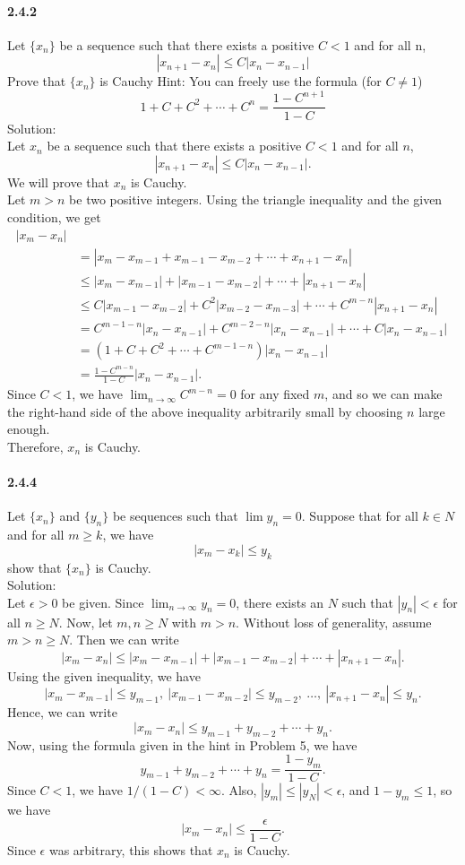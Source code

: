 \documentclass{article}
\begin{document}
\paragraph{2.4.2}
Let $\{x_n\}$ be a sequence such that there exists a positive $C < 1$ and for all n, $$|x_{n+1}-x_n|\leq C|x_n-x_{n-1}|$$
Prove that $\{x_n\}$ is Cauchy Hint: You can freely use the formula (for $C\neq 1$)\\
$$1+C+C^2+\cdots +C^n=\frac{1-C^{n+1}}{1-C}$$
Solution:\\
Let ${x_n}$ be a sequence such that there exists a positive $C < 1$ and for all $n$, $$|x_{n+1}-x_n|\leq C|x_n-x_{n-1}|.$$ We will prove that ${x_n}$ is Cauchy.\\
Let $m>n$ be two positive integers. Using the triangle inequality and the given condition, we get
\begin{align*}
|x_m - x_n| \\&= |x_m - x_{m-1} + x_{m-1} - x_{m-2} + \cdots + x_{n+1} - x_n|\ \\
&\leq |x_m - x_{m-1}| + |x_{m-1} - x_{m-2}| + \cdots + |x_{n+1} - x_n|\
\\&\leq C|x_{m-1} - x_{m-2}| + C^2|x_{m-2} - x_{m-3}| + \cdots + C^{m-n}|x_{n+1} - x_n|\
\\&= C^{m-1-n}|x_n - x_{n-1}| + C^{m-2-n}|x_n - x_{n-1}| + \cdots + C|x_n - x_{n-1}|\
\\&= (1+C+C^2+\cdots+C^{m-1-n})|x_n - x_{n-1}|\
\\&= \frac{1-C^{m-n}}{1-C}|x_n - x_{n-1}|.
\end{align*}
Since $C<1$, we have $\lim_{n\to\infty}C^{m-n} = 0$ for any fixed $m$, and so we can make the right-hand side of the above inequality arbitrarily small by choosing $n$ large enough.\\ Therefore, ${x_n}$ is Cauchy.
\paragraph{2.4.4}
Let $\{x_n\}$ and $\{y_n\}$ be sequences such that $\lim y_n = 0$. Suppose that for all $k \in N$ and for all $m \geq k$, we have $$|x_m-x_k|\leq y_k$$ show that $\{x_n\}$ is Cauchy.\\
Solution:\\
Let $\epsilon > 0$ be given. Since $\lim_{n \to \infty} y_n = 0$, there exists an $N$ such that $|y_n| < \epsilon$ for all $n \geq N$. Now, let $m, n \geq N$ with $m > n$. Without loss of generality, assume $m > n \geq N$. Then we can write $$|x_m - x_n| \leq |x_m - x_{m-1}| + |x_{m-1} - x_{m-2}| + \cdots + |x_{n+1} - x_n|.$$ Using the given inequality, we have $$|x_m - x_{m-1}| \leq y_{m-1}, \ |x_{m-1} - x_{m-2}| \leq y_{m-2}, \ \ldots, \ |x_{n+1} - x_n| \leq y_n.$$ Hence, we can write $$|x_m - x_n| \leq y_{m-1} + y_{m-2} + \cdots + y_n.$$ Now, using the formula given in the hint in Problem 5, we have $$y_{m-1} + y_{m-2} + \cdots + y_n = \frac{1-y_m}{1-C}.$$ Since $C < 1$, we have $1/(1-C) < \infty$. Also, $|y_m| \leq |y_N| < \epsilon$, and $1-y_m \leq 1$, so we have $$|x_m - x_n| \leq \frac{\epsilon}{1-C}.$$ Since $\epsilon$ was arbitrary, this shows that ${x_n}$ is Cauchy.
\end{document}
